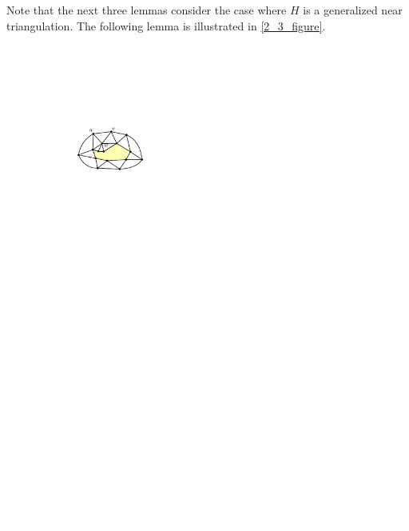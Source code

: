 \documentclass{article}
\theoremstyle{definition}
\begin{document}
Note that the next three lemmas consider the case where $H$ is a generalized near triangulation.  The following lemma is illustrated in \cref{2_3_figure}.

\begin{figure}
  \centering
  \includegraphics[page=1]{figs/2_3_figure}

\end{figure}
\end{document}
